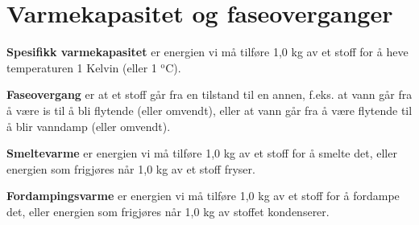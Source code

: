 \section{Varmekapasitet og faseoverganger}

\textbf{Spesifikk varmekapasitet} er energien vi må tilføre 1,0 kg av et stoff for å heve temperaturen 1 Kelvin (eller 1 $^{\text{o}}$C).\\ \vsk



\textbf{Faseovergang} er at et stoff går fra en tilstand til en annen, f.eks. at vann går fra å være is til å bli flytende (eller omvendt), eller at vann går fra å være flytende til å blir vanndamp (eller omvendt). \\ \vsk

\textbf{Smeltevarme} er energien vi må tilføre 1,0 kg av et stoff for å smelte det, eller energien som frigjøres når 1,0 kg av et stoff fryser. \\ \vsk 

\textbf{Fordampingsvarme} er energien vi må tilføre 1,0 kg av et stoff for å fordampe det, eller energien som frigjøres når 1,0 kg av stoffet kondenserer. \\ \vsk 





